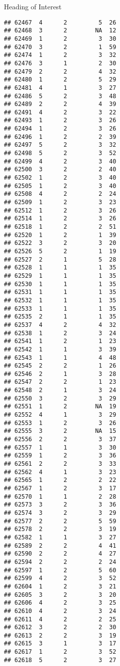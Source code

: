 \documentclass[
  ignorenonframetext,
]{beamer}
\begin{document}
\begin{frame}[fragile]{Heading of Interest}
\begin{verbatim}
## 62467  4      2         5  26
## 62468  3      2        NA  12
## 62469  1      2         3  30
## 62470  3      2         1  59
## 62474  1      2         3  32
## 62476  3      1         2  30
## 62479  2      2         4  32
## 62480  1      2         5  29
## 62481  4      1         3  27
## 62486  5      2         3  48
## 62489  2      2         4  39
## 62491  4      2         3  22
## 62493  1      2         3  26
## 62494  1      2         3  26
## 62496  1      2         2  39
## 62497  5      2         3  32
## 62498  5      2         3  52
## 62499  4      2         3  40
## 62500  3      2         2  40
## 62502  1      2         3  40
## 62505  1      2         3  40
## 62508  4      2         2  24
## 62509  1      2         3  23
## 62512  1      2         3  26
## 62514  1      2         3  26
## 62518  1      2         2  51
## 62520  1      2         1  39
## 62522  3      2         3  20
## 62526  5      2         1  19
## 62527  2      1         5  28
## 62528  1      1         1  35
## 62529  1      1         1  35
## 62530  1      1         1  35
## 62531  1      1         1  35
## 62532  1      1         1  35
## 62533  1      1         1  35
## 62535  2      1         1  35
## 62537  4      2         4  32
## 62538  1      2         3  24
## 62541  1      2         1  23
## 62542  1      1         3  39
## 62543  1      1         4  48
## 62545  2      2         1  26
## 62546  2      1         3  28
## 62547  2      2         1  23
## 62548  2      1         3  24
## 62550  3      2         3  29
## 62551  1      2        NA  19
## 62552  4      1         3  29
## 62553  1      2         3  26
## 62555  3      2        NA  15
## 62556  2      2         3  37
## 62557  1      1         3  30
## 62559  1      2         3  36
## 62561  2      2         3  33
## 62562  4      1         3  23
## 62565  1      2         2  22
## 62567  1      2         3  17
## 62570  1      1         2  28
## 62573  3      2         3  36
## 62574  3      2         3  29
## 62577  2      2         5  59
## 62578  2      2         3  19
## 62582  1      1         3  27
## 62589  2      2         4  41
## 62590  2      2         4  27
## 62594  2      2         2  24
## 62597  1      2         5  60
## 62599  4      2         3  52
## 62604  1      2         3  21
## 62605  3      2         3  20
## 62606  4      2         3  25
## 62610  4      2         3  24
## 62611  4      2         2  25
## 62612  3      2         2  30
## 62613  2      2         3  19
## 62615  3      1         3  17
## 62617  1      2         3  52
## 62618  5      2         3  27

\end{verbatim}
\end{frame}
\end{document}
